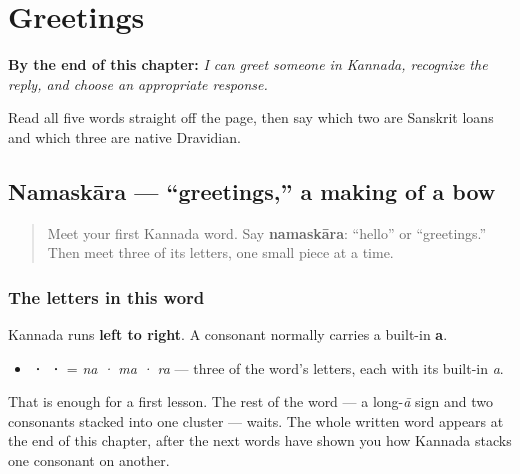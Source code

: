 
\chapter{Greetings}
\label{ch:greetings}

\begin{chapteropening}
\textbf{By the end of this chapter:} \emph{I can greet someone in Kannada, recognize the reply, and choose an appropriate response.}

Read all five words straight off the page, then say which two are Sanskrit loans and which three are native Dravidian.
\end{chapteropening}

\section[\texorpdfstring{\kn{ನಮಸ್ಕಾರ} (namaskāra)}{ನಮಸ್ಕಾರ (namaskāra)}]{Namaskāra — \textquotedblleft{}greetings,\textquotedblright{} a making of a bow}

\label{lesson:KA-C01-namaskara}



\begin{quote}
Meet your first Kannada word. Say \textbf{namaskāra}: “hello” or “greetings.” Then meet three of its letters, one small piece at a time.
\end{quote}

\subsection*{The letters in this word}
Kannada runs \textbf{left to right}. A consonant normally carries a built-in \textbf{a}.

\begin{itemize}
\raggedright
  \item \textbf{ ·  · } = \emph{na · ma · ra} — three of the word's letters, each with its built-in \emph{a}.
\end{itemize}

That is enough for a first lesson. The rest of the word — a long-\emph{ā} sign and two consonants stacked into one cluster — waits. The whole written word appears at the end of this chapter, after the next words have shown you how Kannada stacks one consonant on another.

